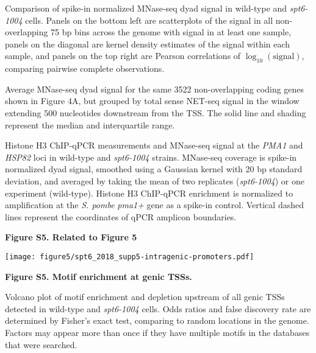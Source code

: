 \documentclass[9pt, letterpaper]{extarticle}
\begin{document}
\begin{description}[noitemsep, topsep=0pt, align=right, labelwidth=12pt, itemindent=0pt, leftmargin=0pt]
	\item [\textbf{(A)}] Comparison of spike-in normalized MNase-seq dyad signal in wild-type and \textit{spt6-1004} cells. Panels on the bottom left are scatterplots of the signal in all non-overlapping 75 bp bins across the genome with signal in at least one sample, panels on the diagonal are kernel density estimates of the signal within each sample, and panels on the top right are Pearson correlations of $\log_{10}\left(\text{signal} \right)$, comparing pairwise complete observations.
	\item [\textbf{(B)}] Average MNase-seq dyad signal for the same 3522 non-overlapping coding genes shown in Figure 4A, but grouped by total sense NET-seq signal in the window extending 500 nucleotides downstream from the TSS. The solid line and shading represent the median and interquartile range.
	\item [\textbf{(C)}] Histone H3 ChIP-qPCR measurements and MNase-seq signal at the \textit{PMA1} and \textit{HSP82} loci in wild-type and \textit{spt6-1004} strains. MNase-seq coverage is spike-in normalized dyad signal, smoothed using a Gaussian kernel with 20 bp standard deviation, and averaged by taking the mean of two replicates (\textit{spt6-1004}) or one experiment (wild-type). Histone H3 ChIP-qPCR enrichment is normalized to amplification at the \textit{S. pombe} \textit{pma1+} gene as a spike-in control. Vertical dashed lines represent the coordinates of qPCR amplicon boundaries.
\end{description}

\newpage
\textbf{\large Figure S5. Related to Figure 5}

{\centering \texttt{[image: figure5/spt6\_2018\_supp5-intragenic-promoters.pdf]}\par}

\textbf{Figure S5. Motif enrichment at genic TSSs.}

\begin{description}[noitemsep, topsep=0pt, align=right, labelwidth=12pt, itemindent=0pt, leftmargin=0pt]
    \item [] Volcano plot of motif enrichment and depletion upstream of all genic TSSs detected in wild-type and \textit{spt6-1004} cells. Odds ratios and false discovery rate are determined by Fisher's exact test, comparing to random locations in the genome. Factors may appear more than once if they have multiple motifs in the databases that were searched.
\end{description}
\end{document}

